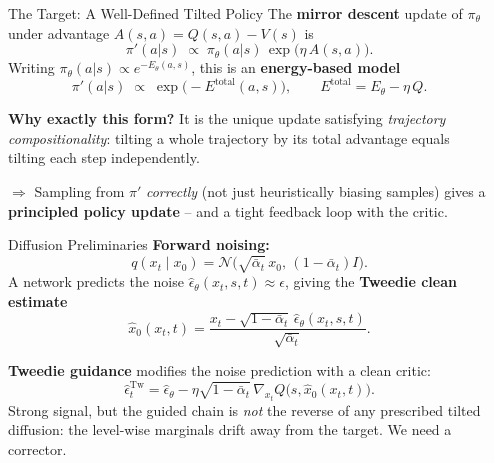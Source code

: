 \documentclass[final,hyperref={pdfpagelabels=false}]{beamer}
\newlength{\colwidth}
\begin{document}
\begin{frame}[t]
\begin{columns}[t]
\begin{column}{\colwidth}
\vspace{0.6cm}

\begin{block}{\Large The Target: A Well-Defined Tilted Policy}
The \textbf{mirror descent} update of $\pi_\theta$ under advantage $A(s,a)=Q(s,a)-V(s)$ is
\[
\pi'(a|s) \;\propto\; \pi_\theta(a|s)\,\exp\!\bigl(\eta\,A(s,a)\bigr).
\]
Writing $\pi_\theta(a|s)\propto e^{-E_\theta(a,s)}$, this is an \textbf{energy-based model}
\[
\pi'(a|s) \;\propto\; \exp\!\bigl(-E^{\mathrm{total}}(a,s)\bigr),
\qquad
E^{\mathrm{total}}=E_\theta - \eta\, Q.
\]

\vspace{0.3em}
\textbf{Why exactly this form?} It is the unique update satisfying
\emph{trajectory compositionality}: tilting a whole trajectory by its total
advantage equals tilting each step independently.

\vspace{0.3em}
$\Rightarrow$ Sampling from $\pi'$ \emph{correctly} (not just heuristically biasing samples)
gives a \textbf{principled policy update} -- and a tight feedback loop with the critic.
\end{block}

\vspace{0.6cm}

\begin{block}{\Large Diffusion Preliminaries}
\textbf{Forward noising:}
\[
q(x_t\mid x_0)=\mathcal{N}\!\bigl(\sqrt{\bar\alpha_t}\,x_0,\,(1-\bar\alpha_t)I\bigr).
\]
A network predicts the noise $\hat\epsilon_\theta(x_t, s, t)\approx \epsilon$, giving the
\textbf{Tweedie clean estimate}
\[
\hat x_0(x_t,t)=\frac{x_t-\sqrt{1-\bar\alpha_t}\,\hat\epsilon_\theta(x_t,s,t)}{\sqrt{\bar\alpha_t}}.
\]

\vspace{0.3em}
\textbf{Tweedie guidance} modifies the noise prediction with a clean critic:
\[
\hat\epsilon^{\mathrm{Tw}}_t = \hat\epsilon_\theta - \eta\sqrt{1-\bar\alpha_t}\,\nabla_{x_t} Q\!\bigl(s,\hat x_0(x_t,t)\bigr).
\]
Strong signal, but the guided chain is \emph{not} the reverse of any prescribed tilted
diffusion: the level-wise marginals drift away from the target. We need a corrector.
\end{block}

\end{column}

\begin{column}{\colwidth}


\end{column}
\end{columns}
\end{frame}
\end{document}
